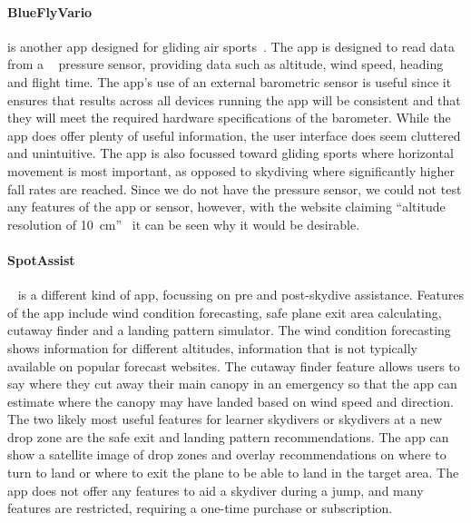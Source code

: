 \paragraph{BlueFlyVario}\label{blueflyvario}
 is another app designed for gliding air sports~\cite{dickie_blueflyvario_2016}. The app is designed to read data from a ~\cite{_blueflyvario_????} pressure sensor, providing data such as altitude, wind speed, heading and flight time.
The app's use of an external barometric sensor is useful since it ensures that results across all devices running the app will be consistent and that they will meet the required hardware specifications of the barometer.
While the app does offer plenty of useful information, the user interface does seem cluttered and unintuitive. The app is also focussed toward gliding sports where horizontal movement is most important, as opposed to skydiving where significantly higher fall rates are reached. Since we do not have the  pressure sensor, we could not test any features of the app or sensor, however, with the website claiming ``altitude resolution of \SI{10}{\centi\metre}''~\cite{_blueflyvario_????} it can be seen why it would be desirable.

\paragraph{SpotAssist}\label{spotassist}
~\cite{inc_spot_2017} is a different kind of app, focussing on pre and post-skydive assistance. Features of the app include wind condition forecasting, safe plane exit area calculating, cutaway finder and a landing pattern simulator. The wind condition forecasting shows information for different altitudes, information that is not typically available on popular forecast websites. The cutaway finder feature allows users to say where they cut away their main canopy in an emergency so that the app can estimate where the canopy may have landed based on wind speed and direction. The two likely most useful features for learner skydivers or skydivers at a new drop zone are the safe exit and landing pattern recommendations. The app can show a satellite image of drop zones and overlay recommendations on where to turn to land or where to exit the plane to be able to land in the target area. The app does not offer any features to aid a skydiver during a jump, and many features are restricted, requiring a one-time purchase or subscription.

